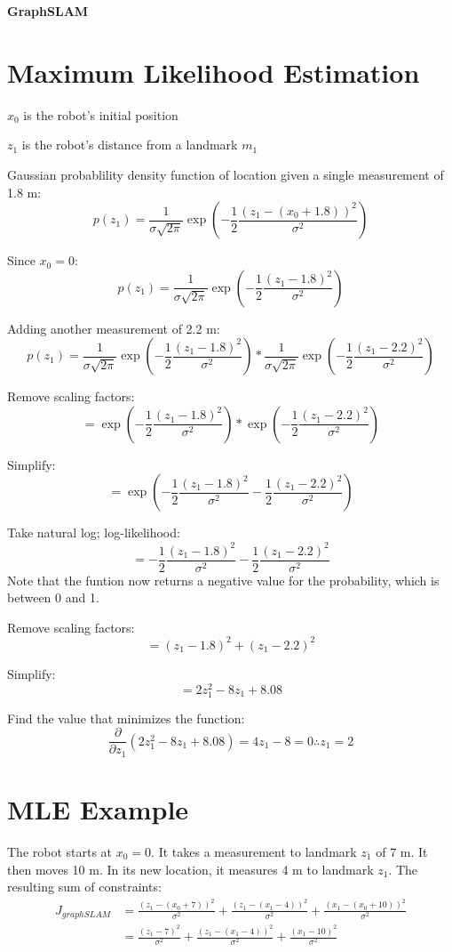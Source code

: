 \documentclass[10pt]{article}
\begin{document}
{\Large \textbf{GraphSLAM}}

\section*{\normalsize Maximum Likelihood Estimation}

$x_0$ is the robot's initial position

$z_1$ is the robot's distance from a landmark $m_1$

Gaussian probablility density function of location given a single measurement of 1.8 m:
$$p(z_1) = \frac{1}{\sigma \sqrt{2 \pi}} \exp \left( -\frac{1}{2} \frac{(z_1 - (x_0 + 1.8))^2}{\sigma^2} \right)$$

Since $x_0 = 0$:
$$p(z_1) = \frac{1}{\sigma \sqrt{2 \pi}} \exp \left( -\frac{1}{2} \frac{(z_1 - 1.8)^2}{\sigma^2} \right)$$

Adding another measurement of 2.2 m:
$$p(z_1) = \frac{1}{\sigma \sqrt{2 \pi}} \exp \left( -\frac{1}{2} \frac{(z_1 - 1.8)^2}{\sigma^2} \right) * \frac{1}{\sigma \sqrt{2 \pi}} \exp \left( -\frac{1}{2} \frac{(z_1 - 2.2)^2}{\sigma^2} \right)$$

Remove scaling factors:
$$= \exp \left( -\frac{1}{2} \frac{(z_1 - 1.8)^2}{\sigma^2} \right) * \exp \left( -\frac{1}{2} \frac{(z_1 - 2.2)^2}{\sigma^2} \right)$$

Simplify:
$$= \exp \left( -\frac{1}{2} \frac{(z_1 - 1.8)^2}{\sigma^2} - \frac{1}{2} \frac{(z_1 - 2.2)^2}{\sigma^2} \right)$$

Take natural log; log-likelihood:
$$= -\frac{1}{2} \frac{(z_1 - 1.8)^2}{\sigma^2} - \frac{1}{2} \frac{(z_1 - 2.2)^2}{\sigma^2}$$
Note that the funtion now returns a negative value for the probability, which is between 0 and 1.

Remove scaling factors:
$$= (z_1 - 1.8)^2 + (z_1 - 2.2)^2$$

Simplify:
$$= 2z_1^2 - 8z_1 + 8.08$$

Find the value that minimizes the function:
$$\frac{\partial}{\partial z_1} (2z_1^2 - 8z_1 + 8.08) = 4z_1 - 8 = 0 \therefore z_1 = 2$$

\section*{\normalsize MLE Example}
The robot starts at $x_0 = 0$. It takes a measurement to landmark $z_1$ of 7 m. It then moves 10 m. In its new location, it measures 4 m to landmark $z_1$. The resulting sum of constraints:
\begin{align*}
J_{graphSLAM} &= \frac{(z_1 - (x_0 + 7))^2}{\sigma^2} + \frac{(z_1 - (x_1 - 4))^2}{\sigma^2} + \frac{(x_1 - (x_0 + 10))^2}{\sigma^2}\\
&= \frac{(z_1 - 7)^2}{\sigma^2} + \frac{(z_1 - (x_1 - 4))^2}{\sigma^2} + \frac{(x_1 - 10)^2}{\sigma^2}
\end{align*}
\end{document}
